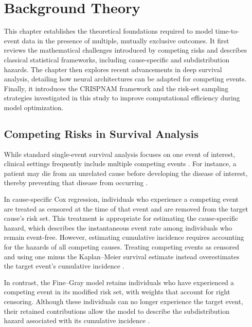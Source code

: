 \documentclass[a4paper,twoside,12pt]{report}
\begin{document}
\chapter{Background Theory}
\label{ch:background_theory}

This chapter establishes the theoretical foundations required to model time-to-event data in the presence of multiple, mutually exclusive outcomes. It first reviews the mathematical challenges introduced by competing risks and describes classical statistical frameworks, including cause-specific and subdistribution hazards. The chapter then explores recent advancements in deep survival analysis, detailing how neural architectures can be adapted for competing events. Finally, it introduces the CRISPNAM framework and the risk-set sampling strategies investigated in this study to improve computational efficiency during model optimization.

\section{Competing Risks in Survival Analysis}
While standard single-event survival analysis focuses on one event of interest, clinical settings frequently include multiple competing events \citep{andersen2012competing}. For instance, a patient may die from an unrelated cause before developing the disease of interest, thereby preventing that disease from occurring \citep{andersen2012competing, prentice1978analysis}.

In cause-specific Cox regression, individuals who experience a competing event are treated as censored at the time of that event and are removed from the target cause's risk set. This treatment is appropriate for estimating the cause-specific hazard, which describes the instantaneous event rate among individuals who remain event-free. However, estimating cumulative incidence requires accounting for the hazards of all competing causes. Treating competing events as censored and using one minus the Kaplan--Meier survival estimate instead overestimates the target event's cumulative incidence \citep{andersen2012competing}.

In contrast, the Fine--Gray model retains individuals who have experienced a competing event in its modified risk set, with weights that account for right censoring. Although these individuals can no longer experience the target event, their retained contributions allow the model to describe the subdistribution hazard associated with its cumulative incidence \citep{FineGray1999}.
\end{document}
